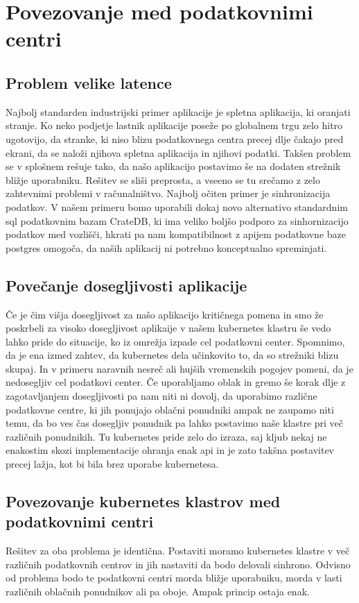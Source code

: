 \documentclass[a4paper, 12pt]{book}
\begin{document}
\chapter{Povezovanje med podatkovnimi centri}
\section{Problem velike latence}
Najbolj standarden industrijski primer aplikacije je spletna aplikacija, ki oranjati stranje. 
Ko neko podjetje lastnik aplikacije poseže po globalnem trgu zelo hitro ugotovijo, da stranke, ki niso blizu podatkovnega centra precej dlje čakajo pred ekrani, da se naloži njihova spletna aplikacija in njihovi podatki.
Takšen problem se v splošnem rešuje tako, da našo aplikacijo postavimo še na dodaten strežnik bližje uporabniku. 
Rešitev se sliši preprosta, a vseeno se tu srečamo z zelo zahtevnimi problemi v
računalništvo. Najbolj očiten primer je sinhronizacija podatkov.
V našem primeru bomo uporabili dokaj novo alternativo standardnim sql podatkovnim bazam CrateDB, ki ima veliko boljšo podporo za sinhornizacijo podatkov med vozlišči, hkrati pa nam kompatibilnost z apijem podatkovne baze postgres omogoča, da naših aplikacij ni potrebno konceptualno spreminjati.
\section{Povečanje dosegljivosti aplikacije}
Če je čim višja dosegljivost za našo aplikacijo kritičnega pomena in smo že poskrbeli za visoko dosegljivost aplikaije v našem kubernetes klastru še vedo lahko pride do situacije, ko iz omrežja izpade cel podatkovni center.
Spomnimo, da je ena izmed zahtev, da kubernetes dela učinkovito to, da so strežniki blizu skupaj.
In v primeru naravnih nesreč ali hujših vremenskih pogojev pomeni, da je nedosegljiv cel podatkovi center.
Če uporabljamo oblak in gremo še korak dlje z zagotavljanjem dosegljivosti pa nam niti ni dovolj, da uporabimo različne podatkovne centre, ki jih ponujajo oblačni ponudniki ampak ne zaupamo niti temu, da bo ves čas dosegljiv ponudnik pa lahko postavimo naše klastre pri več različnih ponudnikih.
Tu kubernetes pride zelo do izraza, saj kljub nekaj ne enakostim skozi implementacije ohranja enak api in je zato takšna postavitev precej lažja, kot bi bila brez uporabe kubernetesa.
\section{Povezovanje kubernetes klastrov med podatkovnimi centri}
Rešitev za oba problema je identična.
Postaviti moramo kubernetes klastre v več različnih podatkovnih centrov in jih nastaviti da bodo delovali sinhrono. Odvisno od problema bodo te podatkovni centri morda bližje uporabniku, morda v lasti različnih oblačnih ponudnikov ali pa oboje. Ampak princip ostaja enak.
\end{document}
